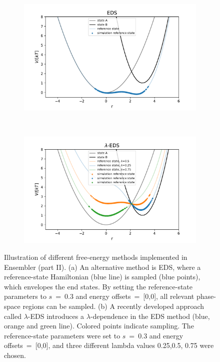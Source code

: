 %
\begin{figure}[H]
	\centering
	\begin{subfigure}{.85\textwidth}
		\caption{}
		\includegraphics[width=\linewidth]{fig/FE_example/EDS_sampling.pdf} 
	\end{subfigure}\\
	\begin{subfigure}{.85\textwidth}
		\caption{}
		\includegraphics[width=\linewidth]{fig/FE_example/hlEDS_sampling.pdf} 
	\end{subfigure}
	\caption{Illustration of different free-energy methods implemented in Ensembler (part II). (a) An alternative method is EDS,\cite{Christ2007, Christ2008, Christ2009} where a reference-state Hamiltonian (blue line) is sampled (blue points), which envelopes the end states. By setting the reference-state parameters to $s$~=~0.3 and energy offsets~=~[0,0], all relevant phase-space regions can be sampled. (b) A recently developed approach called $\lambda$-EDS\cite{Koenig2020} introduces a $\lambda$-dependence in the EDS method (blue, orange and green line). Colored points indicate sampling. The reference-state parameters were set to $s$~=~0.3 and energy offsets~=~[0,0], and three different lambda values 0.25,0.5, 0.75 were chosen.}
	\label{fig:FE_samplingb}
\end{figure}
